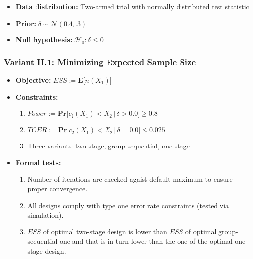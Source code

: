 \documentclass[]{book}
\providecommand{\tightlist}{%
  \setlength{\itemsep}{0pt}\setlength{\parskip}{0pt}}
\begin{document}
\begin{itemize}
\tightlist
\item
  \textbf{Data distribution:} Two-armed trial with normally distributed test statistic
\item
  \textbf{Prior:} \(\delta\sim\mathcal{N}(0.4, .3)\)
\item
  \textbf{Null hypothesis:} \(\mathcal{H}_0:\delta \leq 0\)
\end{itemize}

\hypertarget{variant-ii.1-minimizing-expected-sample-size}{%
\subsubsection{\texorpdfstring{\protect\hyperlink{variantII_1}{Variant II.1: Minimizing Expected Sample Size}}{Variant II.1: Minimizing Expected Sample Size}}\label{variant-ii.1-minimizing-expected-sample-size}}

\begin{itemize}
\tightlist
\item
  \textbf{Objective:} \(ESS := \boldsymbol{E}\big[n(X_1)\big]\)
\item
  \textbf{Constraints:}

  \begin{enumerate}
  \def\labelenumi{\arabic{enumi}.}
  \tightlist
  \item
    \(Power := \boldsymbol{Pr}\big[c_2(X_1) < X_2\,|\,\delta> 0.0\big] \geq 0.8\)
  \item
    \(TOER := \boldsymbol{Pr}\big[c_2(X_1) < X_2\,|\,\delta=0.0\big] \leq 0.025\)
  \item
    Three variants: two-stage, group-sequential, one-stage.
  \end{enumerate}
\item
  \textbf{Formal tests:}

  \begin{enumerate}
  \def\labelenumi{\arabic{enumi}.}
  \tightlist
  \item
    Number of iterations are checked agaist default maximum to ensure proper
    convergence.
  \item
    All designs comply with type one error rate constraints (tested via
    simulation).
  \item
    \(ESS\) of optimal two-stage design is lower than \(ESS\) of optimal
    group-sequential one and that is in turn lower than the one of the
    optimal one-stage design.
  \end{enumerate}
\end{itemize}
\end{document}

